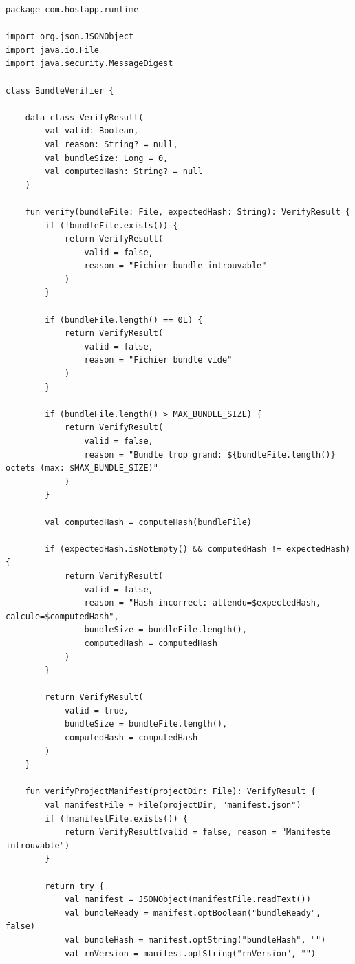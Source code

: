 \documentclass[11pt]{article}
\begin{document}
\begin{verbatim}
package com.hostapp.runtime

import org.json.JSONObject
import java.io.File
import java.security.MessageDigest

class BundleVerifier {

    data class VerifyResult(
        val valid: Boolean,
        val reason: String? = null,
        val bundleSize: Long = 0,
        val computedHash: String? = null
    )

    fun verify(bundleFile: File, expectedHash: String): VerifyResult {
        if (!bundleFile.exists()) {
            return VerifyResult(
                valid = false,
                reason = "Fichier bundle introuvable"
            )
        }

        if (bundleFile.length() == 0L) {
            return VerifyResult(
                valid = false,
                reason = "Fichier bundle vide"
            )
        }

        if (bundleFile.length() > MAX_BUNDLE_SIZE) {
            return VerifyResult(
                valid = false,
                reason = "Bundle trop grand: ${bundleFile.length()} octets (max: $MAX_BUNDLE_SIZE)"
            )
        }

        val computedHash = computeHash(bundleFile)

        if (expectedHash.isNotEmpty() && computedHash != expectedHash) {
            return VerifyResult(
                valid = false,
                reason = "Hash incorrect: attendu=$expectedHash, calcule=$computedHash",
                bundleSize = bundleFile.length(),
                computedHash = computedHash
            )
        }

        return VerifyResult(
            valid = true,
            bundleSize = bundleFile.length(),
            computedHash = computedHash
        )
    }

    fun verifyProjectManifest(projectDir: File): VerifyResult {
        val manifestFile = File(projectDir, "manifest.json")
        if (!manifestFile.exists()) {
            return VerifyResult(valid = false, reason = "Manifeste introuvable")
        }

        return try {
            val manifest = JSONObject(manifestFile.readText())
            val bundleReady = manifest.optBoolean("bundleReady", false)
            val bundleHash = manifest.optString("bundleHash", "")
            val rnVersion = manifest.optString("rnVersion", "")


\end{verbatim}
\end{document}
